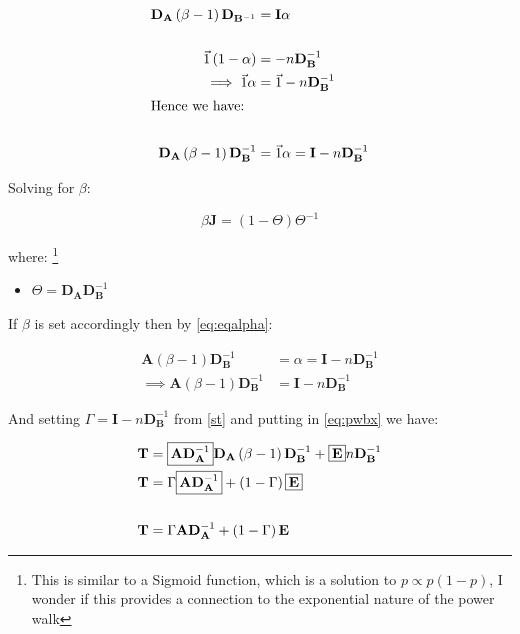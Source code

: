 \documentclass[11pt]{report}
\begin{document}
\begin{align}
\mathbf{D}_{\mathbf{A}}   \left( \beta -  1 \right)\mathbf{D}_{\mathbf{B}^{- 1}} &=\mathbf{I}  \alpha \label{fl} \\
    \ \nonumber \\
  \vec{1}  \left( 1- \alpha \right) &=  - n \mathbf{D}_{\mathbf{B}}^{- 1}  \nonumber \\
    \implies  \vec{1}\alpha &=  \vec{1}- n \mathbf{D}_{\mathbf{B}}^{- 1} \label{st} \\
    \intertext{Hence we have:} \notag \\
\mathbf{D}_{\mathbf{A}}  \left( \beta -  1 \right)\mathbf{D}_{\mathbf{B}}^{- 1} &=  \vec{1}\alpha =  \mathbf{I}- n \mathbf{D}_{\mathbf{B}}^{- 1} \label{eq:eqalpha}
\end{align}

Solving for \(\beta\):

\[
\beta \mathbf{J}  = \left( 1 - \Theta \right) \Theta^{-1} \label{eq:betadef}
\]

where: \footnote{This is similar to a Sigmoid function, which is a solution to \(p \propto p(1-p)\), I wonder if this provides a connection to the exponential nature of the power walk}

\begin{itemize}
\item \(\Theta = \mathbf{D}_{\mathbf{A}} \mathbf{D}_{\mathbf{B}}^{- 1}\)
\end{itemize}

If \(\beta\) is set accordingly then by \eqref{eq:eqalpha}:

\begin{align}
    \mathbf{A}\left( \beta- 1 \right) \mathbf{D}_{\mathbf{B}}^{- 1} &= \alpha = \mathbf{I}- n \mathbf{D}_{\mathbf{B}}^{- 1} \nonumber \\
     \implies  \mathbf{A}\left( \beta- 1 \right) \mathbf{D}_{\mathbf{B}}^{- 1} &=  \mathbf{I}- n \mathbf{D}_{\mathbf{B}}^{- 1}
\end{align}

And setting \(\Gamma = \mathbf{I}- n \mathbf{D}_{\mathbf{B}}^{- 1}\)  from \eqref{st} and putting in \eqref{eq:pwbx} we have:

\begin{align}
\mathbf{T} &= \text{\fboxsep=.2em\fbox{$\mathbf{A}\mathbf{D}_{\mathbf{A}}^{- 1}$}}  \mathbf{D}_{\mathbf{A}} \left( \beta - 1 \right) \mathbf{D}_{\mathbf{B}}^{- 1} + \text{\fboxsep=.2em\fbox{$\mathbf{E}$}} n \mathbf{D}_{\mathbf{B}}^{- 1}  \nonumber \\
  \mathbf{T} &= \Gamma \text{\fboxsep=.2em\fbox{$\mathbf{A}\mathbf{D}_{\mathbf{A}}^{- 1}$}}  + \left( 1-\Gamma \right) \text{\fboxsep=.2em\fbox{$\mathbf{E}$}} \nonumber \\
  \ \nonumber \\
  \mathbf{T} &= \Gamma \mathbf{A}\mathbf{D}_{\mathbf{A}}^{- 1}  + \left( 1-\Gamma \right) \mathbf{E}
  \end{align}
\end{document}
